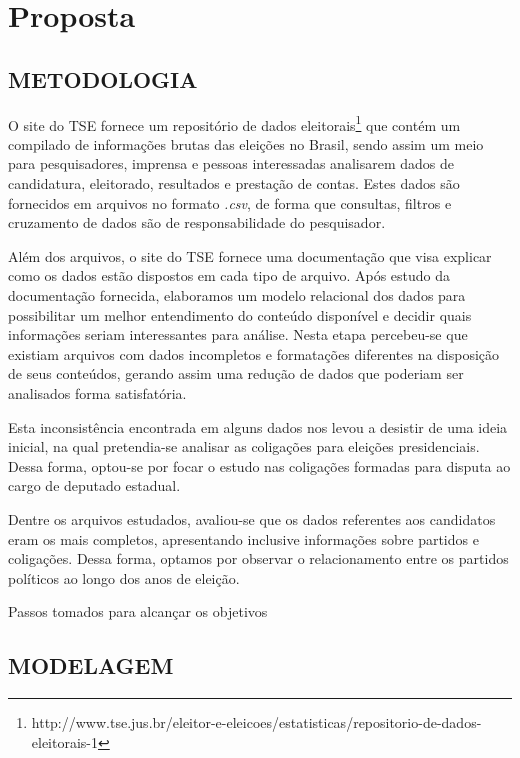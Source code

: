 \chapter{Proposta}
\label{cap3_proposta}

\section{\texorpdfstring{\MakeUppercase{Metodologia}}{}}
\label{secao_metodologia}

O site do \gls{TSE} fornece um repositório de dados eleitorais\footnote{http://www.tse.jus.br/eleitor-e-eleicoes/estatisticas/repositorio-de-dados-eleitorais-1} que contém um compilado de informações brutas das eleições no Brasil, sendo assim um meio para pesquisadores, imprensa e pessoas interessadas analisarem dados de candidatura, eleitorado, resultados e prestação de contas. Estes dados são fornecidos em arquivos no formato \emph{.csv}, de forma que consultas, filtros e cruzamento de dados são de responsabilidade do pesquisador.

Além dos arquivos, o site do \gls{TSE} fornece uma documentação que visa explicar como os dados estão dispostos em cada tipo de arquivo. Após estudo da documentação fornecida, elaboramos um modelo relacional dos dados para possibilitar um melhor entendimento do conteúdo disponível e decidir quais informações seriam interessantes para análise. Nesta etapa percebeu-se que existiam arquivos com dados incompletos e formatações diferentes na disposição de seus conteúdos, gerando assim uma redução de dados que poderiam ser analisados forma satisfatória.

Esta inconsistência encontrada em alguns dados nos levou a desistir de uma ideia inicial, na qual pretendia-se analisar as coligações para eleições presidenciais. Dessa forma, optou-se por focar o estudo nas coligações formadas para disputa ao cargo de deputado estadual.

Dentre os arquivos estudados, avaliou-se que os dados referentes aos candidatos eram os mais completos, apresentando inclusive informações sobre partidos e coligações. Dessa forma, optamos por observar o relacionamento entre os partidos políticos ao longo dos anos de eleição.


Passos tomados para alcançar os objetivos

\section{\texorpdfstring{\MakeUppercase{Modelagem}}{}}
\label{subsecao_modelagem}

